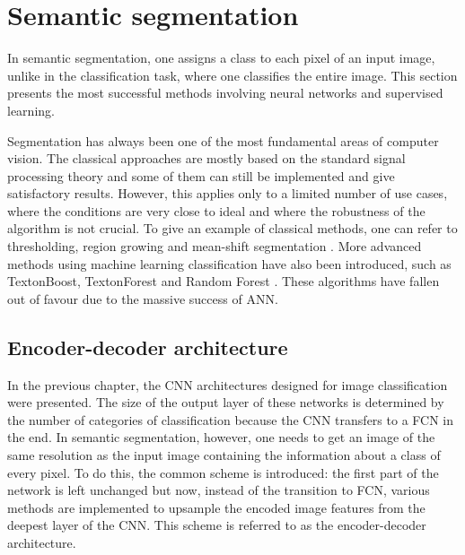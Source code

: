 \newpage
\section{Semantic segmentation}

In semantic segmentation, one assigns a class to each pixel of an input image, unlike in the classification task, where one classifies the entire image. This section presents the most successful methods involving neural networks and supervised learning. 

Segmentation has always been one of the most fundamental areas of computer vision. The classical approaches are mostly based on the standard signal processing theory and some of them can still be implemented and give satisfactory results. However, this applies only to a limited number of use cases, where the conditions are very close to ideal and where the robustness of the algorithm is not crucial. To give an example of classical methods, one can refer to thresholding, region growing and mean-shift segmentation \cite{coufal}. More advanced methods using machine learning classification have also been introduced, such as TextonBoost, TextonForest and Random Forest \cite{segnet} \cite{bayesian}. These algorithms have fallen out of favour due to the massive success of ANN.

\subsection{Encoder-decoder architecture}

In the previous chapter, the CNN architectures designed for image classification were presented. The size of the output layer of these networks is determined by the number of categories of classification because the CNN transfers to a FCN in the end. In semantic segmentation, however, one needs to get an image of the same resolution as the input image containing the information about a class of every pixel. To do this, the common scheme is introduced: the first part of the network is left unchanged but now, instead of the transition to FCN, various methods are implemented to upsample the encoded image features from the deepest layer of the CNN. This scheme is referred to as the encoder-decoder architecture. 

